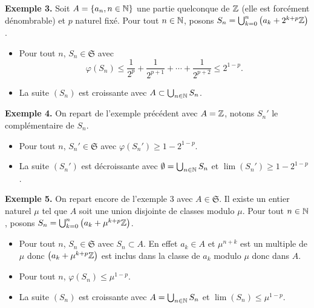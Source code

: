 \textbf{Exemple 3.}\newline \label{SuiteCroissAAquelc}
Soit $A = \left\lbrace a_n, n \in\mathbb{N}\right\rbrace$ une partie quelconque de $\mathbb{Z}$ (elle est forcément dénombrable) et $p$ naturel fixé. Pour tout $n \in \mathbb{N}$, posons $S_n = \bigcup_{k =0}^n \left(a_k + 2^{k+p} \mathbb{Z}\right)$.
 \begin{itemize}
  \item Pour tout $n$, $S_n\in \mathfrak{S}$ avec
  \begin{displaymath}
    \varphi(S_n)\leq \frac{1}{2^p} + \frac{1}{2^{p+1}} + \cdots + \frac{1}{2^{p+2}} \leq 2^{1-p}.
  \end{displaymath}
  \item La suite $(S_n)$ est croissante avec $A \subset \bigcup_{n\in \mathbb{N}}S_n$.
 \end{itemize}

\textbf{Exemple 4.} \newline \label{SuiteIntevide}
On repart de l'exemple précédent avec $A=\mathbb{Z}$, notons $S_n'$ le complémentaire de $S_n$.
 \begin{itemize}
  \item Pour tout $n$, $S_n'\in \mathfrak{S}$ avec $\varphi(S_n')\geq 1- 2^{1-p}$.
  \item La suite $(S_n')$ est décroissante avec $\emptyset = \bigcup_{n\in \mathbb{N}}S_n$ et $\lim (S_n')\geq 1- 2^{1-p}$.
 \end{itemize}

 \textbf{Exemple 5.} \newline \label{SuiteCroissA}
On repart encore de l'exemple 3 avec $A \in \mathfrak{S}$. Il existe un entier naturel $\mu$ tel que $A$ soit une union disjointe de classes modulo $\mu$. Pour tout $n \in \mathbb{N}$, posons $S_n = \bigcup_{k =0}^n \left(a_k + \mu^{k+p} \mathbb{Z}\right)$.
 \begin{itemize}
  \item Pour tout $n$, $S_n\in \mathfrak{S}$ avec $S_n \subset A$. En effet $a_k \in A$ et $\mu^{n+k}$ est un multiple de $\mu$ donc $\left(a_k + \mu^{k+p} \mathbb{Z}\right)$ est inclus dans la classe de $a_k$ modulo $\mu$ donc dans $A$.
  \item Pour tout $n$, $\varphi(S_n)\leq \mu^{1-p}$.
  \item La suite $(S_n)$ est croissante avec $A = \bigcup_{n\in \mathbb{N}}S_n$ et $\lim (S_n)\leq \mu^{1-p}$.
 \end{itemize}





